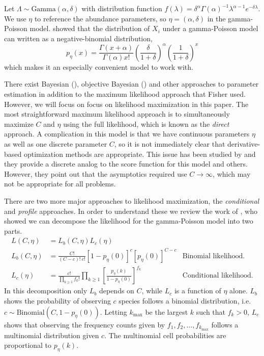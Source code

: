\documentclass[oupdraft]{bio}
\newcommand{\kmax}{k_{\text{max}}}
\begin{document}
Let $\Lambda \sim \text{Gamma}(\alpha, \delta)$ with distribution function $f(\lambda) = \delta^\alpha \Gamma (\alpha)^{-1} \lambda^{\alpha - 1} e^{-\delta \lambda}$.  We use $\eta$ to reference the abundance parameters, so $\eta = (\alpha, \delta)$ in the gamma-Poisson model.  \citet{greenwood_1920} showed that the distribution of $X_i$ under a gamma-Poisson model can written as a negative-binomial distribution,
\[ p_{\eta}(x) = \frac{\Gamma (x + \alpha)}{\Gamma (\alpha) x!} \left(\frac{\delta}{1+\delta} \right)^\alpha \left( \frac{1}{1+ \delta} \right)^x \]
which makes it an especially convenient model to work with.

There exist Bayesian (\citet{efron_1976}), objective Bayesian (\citet{barger_2010}) and other approaches to parameter estimation in addition to the maximum likelihood approach that Fisher used.  However, we will focus on focus on likelihood maximization in this paper.  The most straightforward maximum likelihood approach is to simultaneously maximize $C$ and $\eta$ using the full likelihood, which is known as the \textit{direct} approach.  A complication in this model is that we have continuous parameters $\eta$ as well as one discrete parameter $C$, so it is not immediately clear that derivative-based optimization methods are appropriate.  This issue has been studied by \citet{lindsay_1987} and they provide a discrete analog to the score function for this model and others.  However, they point out that the asymptotics required use $C \to \infty$, which may not be appropriate for all problems.

There are two more major approaches to likelihood maximization, the \textit{conditional} and \textit{profile} approaches.  In order to understand these we review the work of \citet{sanathanan_1977}, who showed we can decompose the likelihood for the gamma-Poisson model into two parts.
\begin{align}
 L(C, \eta) &= L_b(C, \eta)L_c(\eta) \label{eq:likelihood}\\
 L_b(C, \eta) &= \frac{C!}{(C-c)! \ c!} \left[1 - p_{\eta}(0) \right]^c \left[ p_{\eta}(0) \right]^{C-c}  & \text{Binomial likelihood.} \label{eq:binomial_likelihood}\\
 L_c(\eta) &= \frac{c!}{\displaystyle  \prod_{k \geq 1} f_k!} \prod_{k \geq 1} \left[ \frac{p_{\eta}(k)}{1-p_{\eta}(0)} \right]^{f_k} \label{eq:conditional_likelihood}  & \text{Conditional likelihood.}
\end{align}
In this decomposition only $L_b$ depends on $C$, while $L_c$ is a function of $\eta$ alone.  $L_b$ shows the probability of observing $c$ species follows a binomial distribution, i.e. $c \sim \text{Binomial}\left(C, 1- p_{\eta}(0)\right)$.  Letting $\kmax$ be the largest $k$ such that $f_k > 0$, $L_c$ shows that observing the frequency counts given by $f_1, f_2, \dots , f_{\kmax}$ follows a multinomial distribution given $c$.  The multinomial cell probabilities are proportional to $p_{\eta}(k)$.
\end{document}
